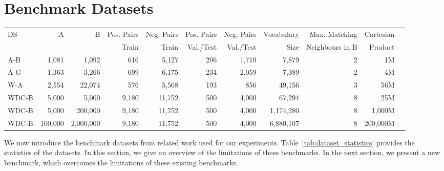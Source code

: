 \documentclass[sigconf,nonacm]{acmart}
\begin{document}
%
 \section{Benchmark Datasets}
\label{sec:datasets}

\begin{table*}[t]
\caption{Dataset statistics of the benchmarked datasets.}
\label{tab:dataset_statistics}
\begin{tabular}{@{}lrrrrrrrrrr@{}}
\toprule
DS    & A    & B      & Pos. Pairs & Neg. Pairs & Pos. Pairs & Neg. Pairs & Vocabulary & Max. Matching & Cartesian\\
    &     &      & Train & Train & Val./Test & Val./Test & Size & Neighbours in B  & Product\\ \midrule
A-B   & 1,081 & 1,092    & 616              & 5,127             & 206                 & 1,710                & 7,879 & 2         &       1M        \\
A-G   & 1,363 & 3,266  & 699              & 6,175             & 234                 & 2,059               & 7,389  & 2           &   4M          \\
W-A   & 2,554 & 22,074   & 576              & 5,568             & 193                 & 856               & 49,156  & 3           &   56M          \\
WDC-B & 5,000 & 5,000  & 9,180             & 11,752            & 500                 & 4,000             & 67,294   & 8         &     25M          \\
WDC-B & 5,000 & 200,000  & 9,180             & 11,752            & 500                 & 4,000             & 1,174,280   & 8      &     1,000M             \\
WDC-B & 100,000 & 2,000,000  & 9,180             & 11,752            & 500                 & 4,000             & 6,880,107   & 8         &     200,000M       \\\bottomrule
\end{tabular}
\end{table*}


We now introduce the benchmark datasets from related work used for our experiments. Table~\ref{tab:dataset_statistics} provides the statistics of the datasets. In this section, we give an overview of the limitations of these benchmarks. In the next section, we present a new benchmark, which overcomes the limitations of these existing benchmarks.
\end{document}

